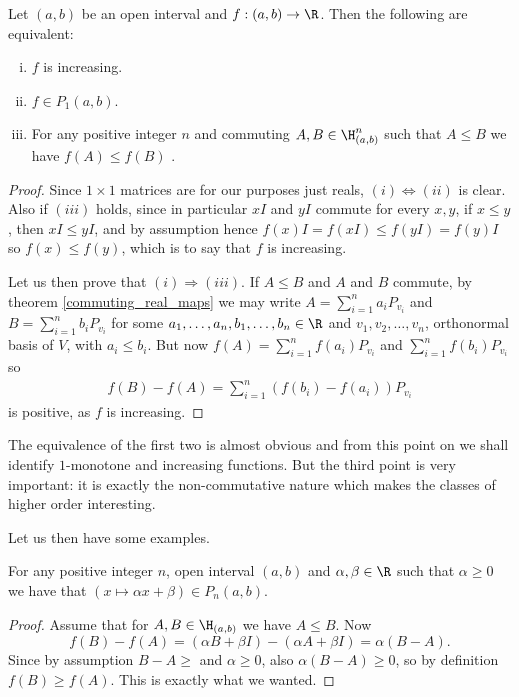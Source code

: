\begin{prop}
	Let $(a, b)$ be an open interval and $f : (a, b) \to \R$. Then the following are equivalent:
	\begin{enumerate}[(i)]
		\item $f$ is increasing.
		\item $f \in P_{1}(a, b)$.
		\item For any positive integer $n$ and commuting $A, B \in \H^{n}_{(a, b)}$ such that $A \leq B$ we have $f(A) \leq f(B)$ .
	\end{enumerate}
\end{prop}
\begin{proof}
	Since $1 \times 1$ matrices are for our purposes just reals, $(i) \Leftrightarrow (ii)$ is clear. Also if $(iii)$ holds, since in particular $x I$ and $y I$ commute for every $x, y$, if $x \leq y$, then $x I \leq y I$, and by assumption hence $f(x) I = f(x I) \leq f(y I) = f(y) I$ so $f(x) \leq f(y)$, which is to say that $f$ is increasing.

	Let us then prove that $(i) \Rightarrow (iii)$. If $A \leq B$ and $A$ and $B$ commute, by theorem \ref{commuting_real_maps} we may write $A = \sum_{i = 1}^{n} a_{i} P_{v_{i}}$ and $B = \sum_{i = 1}^{n} b_{i} P_{v_{i}}$ for some $a_{1}, \ldots, a_{n}, b_{1}, \ldots, b_{n} \in \R$ and $v_{1}, v_{2}, \ldots, v_{n}$, orthonormal basis of $V$, with $a_{i} \leq b_{i}$. But now $f(A) = \sum_{i = 1}^{n} f(a_{i}) P_{v_{i}}$ and $\sum_{i = 1}^{n} f(b_{i}) P_{v_{i}}$ so
	\begin{align*}
		f(B) - f(A) = \sum_{i = 1}^{n} (f(b_{i}) - f(a_{i})) P_{v_{i}}
	\end{align*}
	is positive, as $f$ is increasing.
\end{proof}

The equivalence of the first two is almost obvious and from this point on we shall identify $1$-monotone and increasing functions. But the third point is very important: it is exactly the non-commutative nature which makes the classes of higher order interesting.

Let us then have some examples.

\begin{prop}
	For any positive integer $n$, open interval $(a, b)$ and $\alpha, \beta \in \R$ such that $\alpha \geq 0$ we have that $(x \mapsto \alpha x + \beta) \in P_{n}(a, b)$.
\end{prop}
\begin{proof}
	Assume that for $A, B \in \H_{(a, b)}$ we have $A \leq B$. Now
	\[
		f(B) - f(A) = (\alpha B + \beta I) - (\alpha A + \beta I) = \alpha (B - A).
	\]
	Since by assumption $B - A \geq $ and $\alpha \geq 0$, also $\alpha (B - A) \geq 0$, so by definition $f(B) \geq f(A)$. This is exactly what we wanted.
\end{proof}

